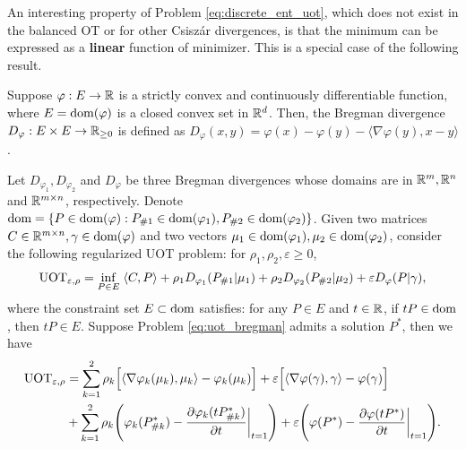 An interesting property of Problem \eqref{eq:discrete_ent_uot}, which does not exist in the
balanced OT or for other Csiszár divergences,
is that the minimum can be expressed as a \textbf{linear} function of minimizer.
This is a special case of the following result.
\begin{definition}
  Suppose $\varphi: E \to \mathbb R$ is a strictly convex and continuously differentiable function,
  where $E = \text{dom}(\varphi)$ is a closed convex set in $\mathbb R^d$. Then,
  the Bregman divergence $D_{\varphi}: E \times E \to \mathbb R_{\geq 0}$ is defined as
  $D_{\varphi}(x, y) = \varphi(x) - \varphi(y) - \langle \nabla \varphi(y), x - y \rangle$.
\end{definition}
\begin{corollary}
  \label{prop:uot_minimizer}
  Let $D_{\varphi_1}, D_{\varphi_2}$ and $D_{\varphi}$ be three Bregman divergences whose
  domains are in $\mathbb R^m, \mathbb R^n$ and $\mathbb R^{m \times n}$, respectively. Denote
  $\text{dom} = \{P \in \text{dom}(\varphi): P_{\#1} \in \text{dom}(\varphi_1), P_{\#2} \in \text{dom}(\varphi_2) \}$.
  Given two matrices $C \in \mathbb R^{m \times n}, \gamma \in \text{dom}(\varphi)$ and
  two vectors $\mu_1 \in \text{dom}(\varphi_1), \mu_2 \in \text{dom}(\varphi_2)$,
  consider the following regularized UOT problem: for $\rho_1, \rho_2, \varepsilon \geq 0$,
  \begin{align}
    \label{eq:uot_bregman}
    \text{UOT}_{\varepsilon, \rho} = \inf_{P \in E} \; \langle C, P \rangle
    + \rho_1 D_{\varphi_1}(P_{\# 1} | \mu_1) +
    \rho_2 D_{\varphi_2}(P_{\# 2} | \mu_2) + \varepsilon D_{\varphi}(P | \gamma),
  \end{align}
  where the constraint set $E \subset \text{dom}$ satisfies: for any $P \in E$ and $t \in \mathbb R$,
  if $tP \in \text{dom}$, then $t P \in E$. Suppose Problem \eqref{eq:uot_bregman}
  admits a solution $P^*$, then we have
  \begin{equation}
    \begin{split}
      \text{UOT}_{\varepsilon, \rho} &=
    \sum_{k=1}^2 \rho_k \Big[ \langle \nabla \varphi_k(\mu_k), \mu_k \rangle - \varphi_k(\mu_k) \Big]
    + \varepsilon \Big[ \langle \nabla \varphi(\gamma), \gamma \rangle - \varphi(\gamma) \Big] \\
    &+ \sum_{k=1}^2
    \rho_k \Bigg( \varphi_k(P^*_{\# k}) - \frac{\partial \varphi_k(tP^*_{\# k})}{\partial t} \bigg|_{t=1} \Bigg)
    + \varepsilon \Bigg( \varphi(P^*) - \frac{\partial \varphi(tP^*)}{\partial t} \bigg|_{t=1} \Bigg).
    \end{split}
  \end{equation}
\end{corollary}
